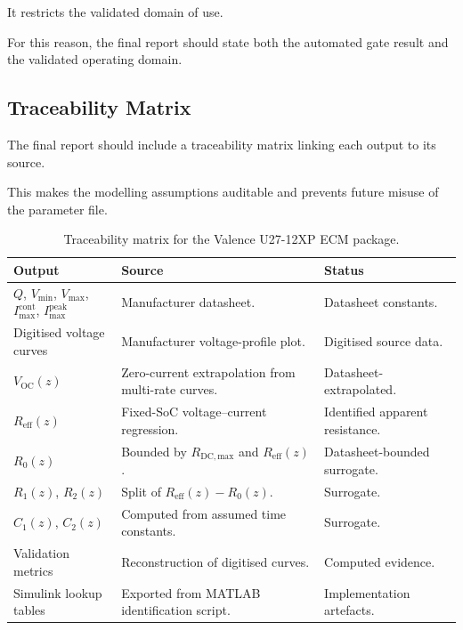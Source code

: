 \documentclass[a4paper,12pt]{article}
\begin{document}
It restricts the validated domain of use.

For this reason, the final report should state both the automated gate result and the validated operating domain.

\subsection{Traceability Matrix}

The final report should include a traceability matrix linking each output to its source.

This makes the modelling assumptions auditable and prevents future misuse of the parameter file.

\begin{table}[H]
\centering
\caption{Traceability matrix for the Valence U27-12XP ECM package.}
\label{tab:deliverables_traceability_matrix}
\begin{tabularx}{0.98\textwidth}{@{}L{0.24\textwidth}L{0.28\textwidth}Y@{}}
\toprule
\textbf{Output} &
\textbf{Source} &
\textbf{Status} \\
\midrule
\(Q\), \(V_{\min}\), \(V_{\max}\), \(I_{\max}^{\mathrm{cont}}\), \(I_{\max}^{\mathrm{peak}}\) &
Manufacturer datasheet. &
Datasheet constants. \\
Digitised voltage curves &
Manufacturer voltage-profile plot. &
Digitised source data. \\
\(V_{\mathrm{OC}}(z)\) &
Zero-current extrapolation from multi-rate curves. &
Datasheet-extrapolated. \\
\(R_{\mathrm{eff}}(z)\) &
Fixed-SoC voltage--current regression. &
Identified apparent resistance. \\
\(R_0(z)\) &
Bounded by \(R_{\mathrm{DC,max}}\) and \(R_{\mathrm{eff}}(z)\). &
Datasheet-bounded surrogate. \\
\(R_1(z)\), \(R_2(z)\) &
Split of \(R_{\mathrm{eff}}(z)-R_0(z)\). &
Surrogate. \\
\(C_1(z)\), \(C_2(z)\) &
Computed from assumed time constants. &
Surrogate. \\
Validation metrics &
Reconstruction of digitised curves. &
Computed evidence. \\
Simulink lookup tables &
Exported from MATLAB identification script. &
Implementation artefacts. \\
\bottomrule
\end{tabularx}
\end{table}
\end{document}
